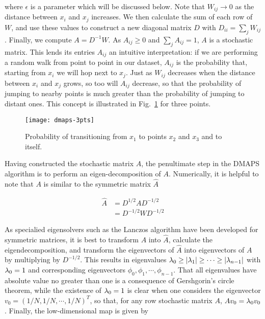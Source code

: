 where $\epsilon$ is a parameter which will be discussed below. Note
that $W_{ij} \rightarrow 0$ as the distance between $x_i$ and $x_j$
increases. We then calculate the sum of each row of $W$, and use these
values to construct a new diagonal matrix $D$ with
$D_{ii} = \sum_j W_{ij}$. Finally, we compute $A = D^{-1} W$. As
$A_{ij} \ge 0$ and $\sum_j A_{ij} = 1$, $A$ is a stochastic
matrix. This lends its entries $A_{ij}$ an intuitive interpretation:
if we are performing a random walk from point to point in our dataset,
$A_{ij}$ is the probability that, starting from $x_i$ we will hop next
to $x_j$. Just as $W_{ij}$ decreases when the distance between $x_i$
and $x_j$ grows, so too will $A_{ij}$ decrease, so that the
probability of jumping to nearby points is much greater than the
probability of jumping to distant ones. This concept is illustrated in
Fig.~\ref{fig:dmaps-3pts} for three points.

\begin{figure}
  \centering
  \texttt{[image: dmaps-3pts]}
  \caption[Illustration of random walk on data]{Probability of
    transitioning from $x_1$ to points $x_2$ and $x_3$ and to
    itself. \label{fig:dmaps-3pts}}
\end{figure}


Having constructed the stochastic matrix $A$, the penultimate step in
the DMAPS algorithm is to perform an eigen-decomposition of
$A$. Numerically, it is helpful to note that $A$ is similar to the
symmetric matrix $\hat{A}$

\begin{align}
  \hat{A} &= D^{1/2}A D^{-1/2} \\
  & = D^{-1/2} W D^{-1/2}
\end{align}

As specialied eigensolvers such as the Lanczos algorithm have been
developed for symmetric matrices, it is best to transform $A$ into
$\hat{A}$, calculate the eigendecomposition, and transform the
eigenvectors of $\hat{A}$ into eigenvectors of $A$ by multiplying by
$D^{-1/2}$. This results in eigenvalues
$\lambda_0 \ge |\lambda_1| \ge \cdots \ge |\lambda_{n-1}|$ with $\lambda_0 = 1$ and
corresponding eigenvectors $\phi_0, \phi_1, \cdots, \phi_{n-1}$. That
all eigenvalues have absolute value no greater than one is a
consequence of Gershgorin's circle theorem, while the existence of
$\lambda_0 = 1$ is clear when one considers the eigenvector $v_0 = (1/N,
1/N, \cdots, 1/N)^T$, so that, for any row stochastic matrix $A$, $A
v_0 = \lambda_0 v_0$. Finally, the low-dimensional map is given by

